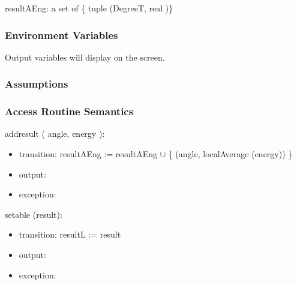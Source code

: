 \documentclass[12pt, titlepage]{article}
\begin{document}
resultAEng: a set of \{ tuple (DegreeT, real )\}  \\

\subsubsection{Environment Variables}
Output variables will display on the screen. 

\subsubsection{Assumptions}


\subsubsection{ Access Routine Semantics}

\noindent  addresult ( angle, energy ):
\begin{itemize}
\item transition: resultAEng := resultAEng $\cup$ \{ (angle, localAverage (energy))  \}

\item output:
\item exception: 
\end{itemize}


\noindent  setable (result):
\begin{itemize}
\item transition: resultL := result
\item output:
\item exception: 
\end{itemize}
\end{document}
